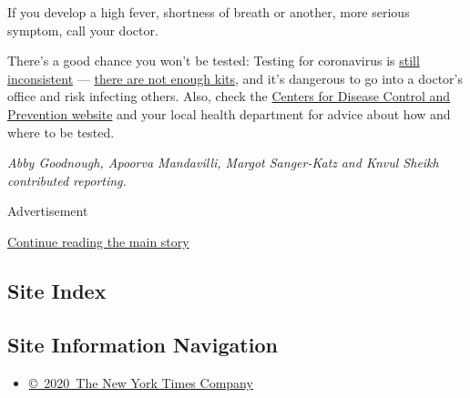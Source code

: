 If you develop a high fever, shortness of breath or another, more
serious symptom, call your doctor.

There's a good chance you won't be tested: Testing for coronavirus is
\href{https://www.nytimes.com/2020/03/02/health/coronavirus-testing-cdc.html}{still
inconsistent} ---
\href{https://www.nytimes.com/2020/03/06/health/testing-coronavirus.html}{there
are not enough kits}, and it's dangerous to go into a doctor's office
and risk infecting others. Also, check the
\href{https://www.cdc.gov/coronavirus/2019-ncov/if-you-are-sick/steps-when-sick.html?CDC_AA_refVal=https\%3A\%2F\%2Fwww.cdc.gov\%2Fcoronavirus\%2F2019-ncov\%2Fabout\%2Fsteps-when-sick.html}{Centers
for Disease Control and Prevention website} and your local health
department for advice about how and where to be tested.

\emph{Abby Goodnough, Apoorva Mandavilli, Margot Sanger-Katz} \emph{and
Knvul Sheikh contributed reporting.}

Advertisement

\protect\hyperlink{after-bottom}{Continue reading the main story}

\hypertarget{site-index}{%
\subsection{Site Index}\label{site-index}}

\hypertarget{site-information-navigation}{%
\subsection{Site Information
Navigation}\label{site-information-navigation}}

\begin{itemize}
\tightlist
\item
  \href{https://help.nytimes.com/hc/en-us/articles/115014792127-Copyright-notice}{©~2020~The
  New York Times Company}
\end{itemize}

